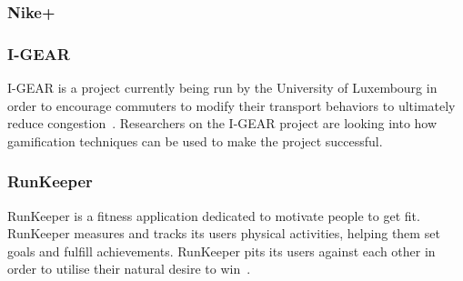 \documentclass[a4paper,12pt]{article}
\begin{document}
\subsubsection{Nike+}


\subsubsection{I-GEAR}
I-GEAR is a project currently being run by the University of Luxembourg in order to encourage commuters to modify their transport behaviors to ultimately reduce congestion~\citep{igear,igear-2}. Researchers on the I-GEAR project are looking into how gamification techniques can be used to make the project successful.

\subsubsection{RunKeeper}
RunKeeper is a fitness application dedicated to motivate people to get fit. RunKeeper measures and tracks its users physical activities, helping them set goals and fulfill achievements. RunKeeper pits its users against each other in order to utilise their natural desire to win~\citep{desire-to-win}.
\end{document}
